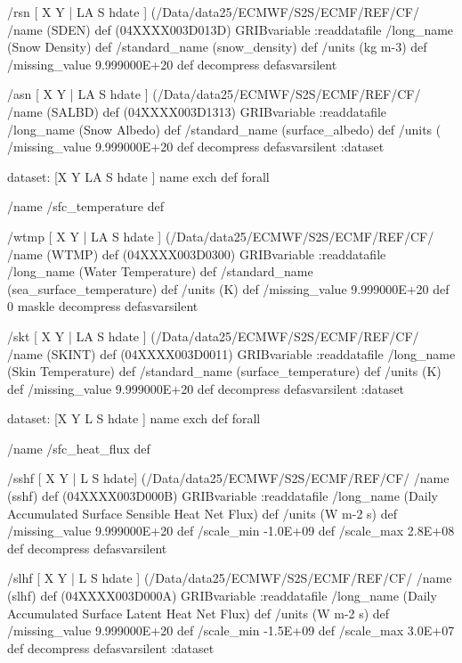 \begin{ingrid}
{/rsn { [ X Y | LA S hdate ] (/Data/data25/ECMWF/S2S/ECMF/REF/CF/%
/name (SDEN) def
(04XXXX003D013D) GRIBvariable
:readdatafile
/long_name (Snow Density) def
/standard_name (snow_density) def
/units (kg m-3) def
/missing_value 9.999000E+20 def
decompress
} defasvarsilent

/asn { [ X Y | LA S hdate ] (/Data/data25/ECMWF/S2S/ECMF/REF/CF/%
/name (SALBD) def
(04XXXX003D1313) GRIBvariable
:readdatafile
/long_name (Snow Albedo) def
/standard_name (surface_albedo) def
/units (%
/missing_value 9.999000E+20 def
decompress
} defasvarsilent
:dataset

dataset:
[X Y LA S hdate ] {name exch def } forall

/name /sfc_temperature def

/wtmp { [ X Y | LA S hdate ] (/Data/data25/ECMWF/S2S/ECMF/REF/CF/%
/name (WTMP) def
(04XXXX003D0300) GRIBvariable
:readdatafile
/long_name (Water Temperature) def
/standard_name (sea_surface_temperature) def
/units (K) def
/missing_value 9.999000E+20 def
0 maskle
decompress
} defasvarsilent

/skt { [ X Y | LA S hdate ] (/Data/data25/ECMWF/S2S/ECMF/REF/CF/%
/name (SKINT) def
(04XXXX003D0011) GRIBvariable
:readdatafile
/long_name (Skin Temperature) def
/standard_name (surface_temperature) def
/units (K) def
/missing_value 9.999000E+20 def
decompress
} defasvarsilent
:dataset

dataset:
[X Y L S hdate ] {name exch def } forall

/name /sfc_heat_flux def

/sshf { [ X Y | L S hdate] (/Data/data25/ECMWF/S2S/ECMF/REF/CF/%
/name (sshf) def
(04XXXX003D000B) GRIBvariable
:readdatafile
/long_name (Daily Accumulated Surface Sensible Heat Net Flux) def
/units (W m-2 s) def
/missing_value 9.999000E+20 def
/scale_min -1.0E+09 def
/scale_max 2.8E+08 def
decompress
} defasvarsilent

/slhf { [ X Y | L S hdate ] (/Data/data25/ECMWF/S2S/ECMF/REF/CF/%
/name (slhf) def
(04XXXX003D000A) GRIBvariable
:readdatafile
/long_name (Daily Accumulated Surface Latent Heat Net Flux) def
/units (W m-2 s) def
/missing_value 9.999000E+20 def
/scale_min -1.5E+09 def
/scale_max 3.0E+07 def
decompress
} defasvarsilent
:dataset

}
\end{ingrid}
